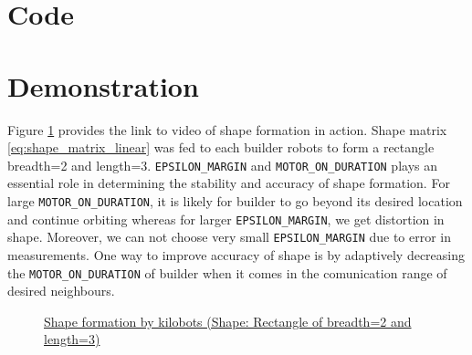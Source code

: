 \documentclass{report}[12pt]
\begin{document}
\section{Code}



\section{Demonstration}
Figure \ref{fig:shape_formation_demo} provides the link to video of shape formation in action. Shape matrix \eqref{eq:shape_matrix_linear} was fed to each builder robots to form a rectangle  breadth=2 and length=3. \texttt{EPSILON\_MARGIN} and \texttt{MOTOR\_ON\_DURATION} plays an essential role in determining the stability and accuracy of shape formation. For large \texttt{MOTOR\_ON\_DURATION}, it is likely for builder to go beyond its desired location and continue orbiting whereas for larger \texttt{EPSILON\_MARGIN}, we get distortion in shape. Moreover, we can not choose very small \texttt{EPSILON\_MARGIN} due to error in measurements. One way to improve accuracy of shape is by adaptively decreasing the \texttt{MOTOR\_ON\_DURATION} of builder when it comes in the comunication range of desired neighbours.
\begin{figure}[H]
	\centering
	\caption{\href{https://youtu.be/SoDq9GQvNAE}{Shape formation by kilobots (Shape: Rectangle of breadth=2 and length=3)}}
	\label{fig:shape_formation_demo}
\end{figure}
\end{document}
